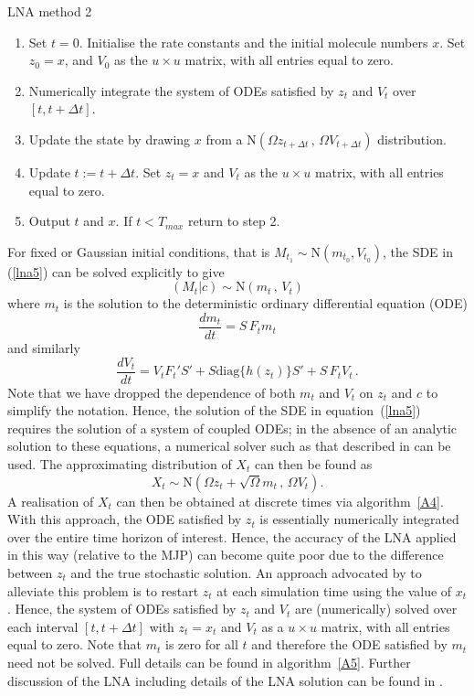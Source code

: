 \documentclass[12pt, DIV12]{scrartcl}
\begin{document}
\begin{algorithm}[t]
\caption{LNA method 2}\label{A5}
\begin{enumerate}
\item Set $t=0$. Initialise the rate constants and the initial molecule numbers
  $x$. Set $z_{0}=x$, and $V_{0}$ as the $u\times u$ matrix, with all entries
  equal to zero.
\item Numerically integrate the system of ODEs satisfied by $z_t$ and $V_t$ over
  $[t,t+\Delta t]$.
\item Update the state by drawing $x$ from a $\textrm{N}\left(\Omega z_{t+\Delta
      t}\,,\, \Omega V_{t+\Delta t}\right)$ distribution.
\item Update $t:=t+\Delta t$. Set $z_{t}=x$ and $V_{t}$ as the $u\times u$
  matrix, with all entries equal to zero.
\item Output $t$ and $x$. If $t<T_{max}$ return to step 2.
\end{enumerate}
\end{algorithm}  

For fixed or Gaussian initial conditions, that is $M_{t_{1}}\sim
\textrm{N}(m_{t_{0}},V_{t_{0}})$, the SDE in (\ref{lna5}) can be solved
explicitly to give
\[
\left(M_{t}|c\right) \sim \textrm{N}\left(m_{t}\,,\,V_{t}\right)
\] 
where $m_{t}$ is the solution to the deterministic ordinary differential
equation (ODE)
\[
\frac{dm_{t}}{dt} = S\,F_t m_{t}
\]
and similarly
\[
\frac{dV_{t}}{dt} = V_{t}F_{t}'S' + S\textrm{diag}\{h(z_t)\}S' + S\,F_{t}V_{t} \,.
\]
Note that we have dropped the dependence of both $m_{t}$ and $V_{t}$ on $z_{t}$
and $c$ to simplify the notation. Hence, the solution of the SDE in
equation~(\ref{lna5}) requires the solution of a system of coupled ODEs; in the
absence of an analytic solution to these equations, a numerical solver such as
that described in \cite{petzold83} can be used. The approximating distribution
of $X_{t}$ can then be found as
\[
X_{t} \sim \textrm{N}\left(\Omega z_{t}+\sqrt{\Omega}m_{t}\,,\, \Omega V_{t}\right).
\]  
A realisation of $X_t$ can then be obtained at discrete times via
algorithm~\ref{A4}. With this approach, the ODE satisfied by $z_t$ is
essentially numerically integrated over the entire time horizon of interest.
Hence, the accuracy of the LNA applied in this way (relative to the MJP) can
become quite poor due to the difference between $z_t$ and the true stochastic
solution. An approach advocated by \cite{fearnhead12} to alleviate this problem
is to restart $z_t$ at each simulation time using the value of $x_t$. Hence, the
system of ODEs satisfied by $z_t$ and $V_t$ are (numerically) solved over each
interval $[t,t+\Delta t]$ with $z_{t}=x_{t}$ and $V_{t}$ as a $u\times u$
matrix, with all entries equal to zero. Note that $m_{t}$ is zero for all $t$
and therefore the ODE satisfied by $m_t$ need not be solved. Full details can be
found in algorithm~\ref{A5}. Further discussion of the LNA including details of
the LNA solution can be found in \cite{kampen2001,elf03,
  Komorowski09,Wilkinson06}.
\end{document}
